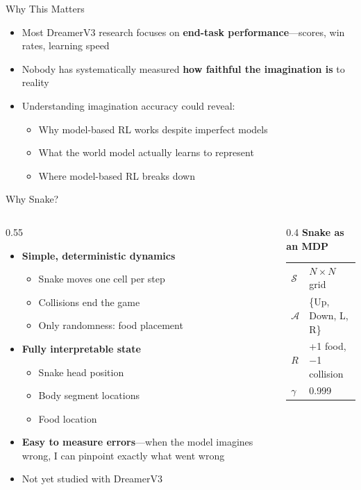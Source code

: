 \documentclass[aspectratio=169]{beamer}
\begin{document}
\begin{frame}{Why This Matters}
\begin{itemize}
    \item Most DreamerV3 research focuses on \textbf{end-task performance}---scores, win rates, learning speed
    \item Nobody has systematically measured \textbf{how faithful the imagination is} to reality
    \item Understanding imagination accuracy could reveal:
    \begin{itemize}
        \item Why model-based RL works despite imperfect models
        \item What the world model actually learns to represent
        \item Where model-based RL breaks down
    \end{itemize}
\end{itemize}
\end{frame}

\begin{frame}{Why Snake?}
\begin{columns}
\begin{column}{0.55\textwidth}
\begin{itemize}
    \item \textbf{Simple, deterministic dynamics}
    \begin{itemize}
        \item Snake moves one cell per step
        \item Collisions end the game
        \item Only randomness: food placement
    \end{itemize}
    \item \textbf{Fully interpretable state}
    \begin{itemize}
        \item Snake head position
        \item Body segment locations
        \item Food location
    \end{itemize}
    \item \textbf{Easy to measure errors}---when the model imagines wrong, I can pinpoint exactly what went wrong
    \item Not yet studied with DreamerV3
\end{itemize}
\end{column}
\begin{column}{0.4\textwidth}
\centering
\textbf{Snake as an MDP}\\[0.5em]
\begin{tabular}{ll}
$\mathcal{S}$ & $N \times N$ grid \\
$\mathcal{A}$ & \{Up, Down, L, R\} \\
$R$ & +1 food, $-$1 collision \\
$\gamma$ & 0.999 \\
\end{tabular}
\end{column}
\end{columns}
\end{frame}
\end{document}
